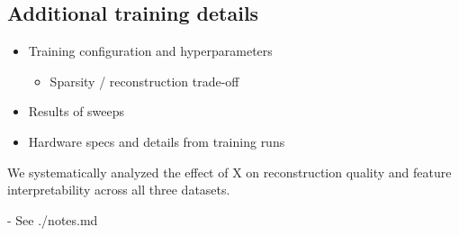 \subsection{Additional training details}

\begin{itemize}
    \item Training configuration and hyperparameters
    \begin{itemize}
        \item Sparsity / reconstruction trade-off
    \end{itemize}
    \item Results of sweeps
    \item Hardware specs and details from training runs
\end{itemize}

We systematically analyzed the effect of X on reconstruction quality and feature interpretability across all three datasets.

- See ./notes.md